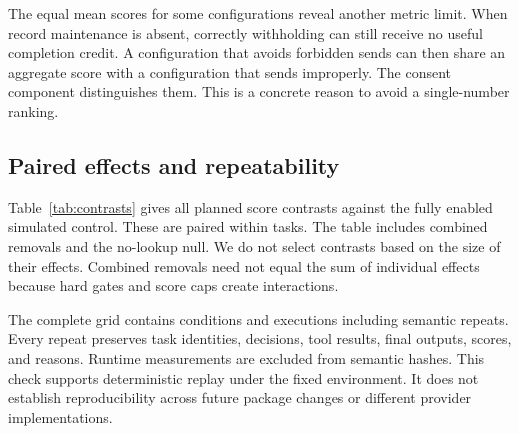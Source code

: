 \documentclass{article}
\begin{document}
The equal mean scores for some configurations reveal another metric limit. When record maintenance is absent, correctly withholding can still receive no useful completion credit. A configuration that avoids forbidden sends can then share an aggregate score with a configuration that sends improperly. The consent component distinguishes them. This is a concrete reason to avoid a single-number ranking.\par
\subsection{Paired effects and repeatability}
Table~\ref{tab:contrasts} gives all planned score contrasts against the fully enabled simulated control. These are paired within tasks. The table includes combined removals and the no-lookup null. We do not select contrasts based on the size of their effects. Combined removals need not equal the sum of individual effects because hard gates and score caps create interactions.\par
\begin{table}[ht]\centering\small\caption{Paired score differences from the full simulated control. Intervals use scenario-stratified bootstrap and retain task alignment. Negative values mean lower native scores.}\label{tab:contrasts}\end{table}
The complete grid contains \ConditionCount{} conditions and \EpisodeCount{} executions including semantic repeats. Every repeat preserves task identities, decisions, tool results, final outputs, scores, and reasons. Runtime measurements are excluded from semantic hashes. This check supports deterministic replay under the fixed environment. It does not establish reproducibility across future package changes or different provider implementations.\par
\end{document}

